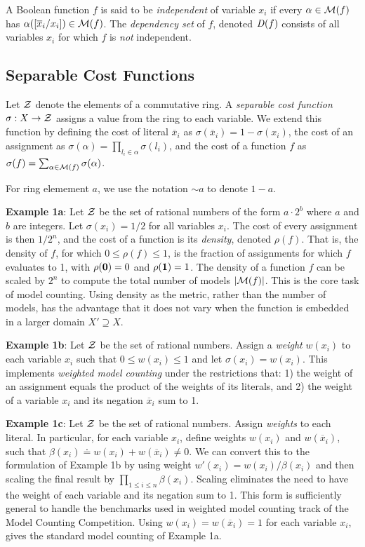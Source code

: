 \documentclass{llncs}
\newcommand{\one}{\mbox{\bf 1}}
\newcommand{\zero}{\mbox{\bf 0}}
\newcommand{\obar}[1]{\overline{#1}}
\newcommand{\oneminus}{{\sim}}
\newcommand{\interp}{\alpha}
\newcommand{\interpset}[1]{{\cal M}(#1)}
\newcommand{\ring}{{\cal Z}}
\newcommand{\cost}{\sigma}
\newcommand{\density}{\rho}
\newcommand{\depend}{{\it D}}
\newcommand{\subs}[2]{[#2/#1]}
\begin{document}
A Boolean function $f$ is said to be {\em independent} of variable
$x_i$ if every $\interp \in \interpset{f}$ has
$\interp(\subs{x_i}{\obar{x}_i}) \in \interpset{f}$.
The {\em dependency set} of $f$, denoted
$\depend(f)$ consists of all variables $x_i$ for which $f$ is {\em
  not} independent.

\subsection{Separable Cost Functions}

Let $\ring$ denote the elements of a commutative ring.  A {\em
  separable cost function} $\cost:X \rightarrow \ring$ assigns a value
from the ring to each variable.  We extend this function by defining
the cost of literal $\obar{x}_i$ as $\cost(\obar{x}_i) = 1 - \cost(x_i)$, the cost
of an assignment as
$\cost(\interp) = \prod_{l_i \in \interp} \cost(l_i)$,
and the cost of a function $f$ as
$\cost(f) = \sum_{\interp \in \interpset{f}} \cost(\interp)$.

For ring elemement $a$, we use the notation $\oneminus a$ to denote $1 - a$.

{\bf Example 1a}: Let $\ring$ be the set of rational numbers of the form $a\cdot 2^b$ where $a$ and $b$ are integers.
Let $\cost(x_i) = 1/2$ for all variables $x_i$.  The cost of every
assignment is then $1/2^{n}$, and the cost of a function is its
{\em density}, denoted $\density(f)$.  That is, the density of $f$, for which
$0 \leq \density(f) \leq 1$, 
is the fraction of assignments for which $f$
evaluates to 1, with $\density(\zero) = 0$ and $\density(\one) = 1$.  The density of a function
$f$ can be scaled by $2^n$ to compute the total number of models
$|\interpset{f}|$.  This is the core task of model counting.  Using
density as the metric, rather than the number of models, has the advantage that it does not vary when the
function is embedded in a larger domain $X' \supseteq X$.  

{\bf Example 1b}: Let $\ring$ be the set of rational numbers.  Assign a
{\em weight} $w(x_i)$ to each variable $x_i$ such that
$0 \leq w(x_i) \leq 1$
and let $\cost(x_i) = w(x_i)$.  This implements {\em weighted model counting}
under the restrictions that: 
1) the
weight of an assignment equals the product of the weights of its
literals, and 2) the weight of a variable $x_i$ and its negation
$\obar{x}_i$ sum to 1.

{\bf Example 1c}: Let $\ring$ be the set of rational numbers.  Assign
{\em weights} to each literal.  In particular, for each variable
$x_i$, define weights $w(x_i)$ and $w(\obar{x}_i)$, such that
$\beta(x_i) \doteq w(x_i) + w(\obar{x}_i) \not = 0$.  We can convert
this to the formulation of Example 1b by using weight $w'(x_i) =
w(x_i)/\beta(x_i)$ and then scaling the final result by $\prod_{1 \leq
  i \leq n} \beta(x_i)$.  Scaling eliminates the need to have the weight
of each variable and its negation sum to 1.  This form is sufficiently general
to handle the benchmarks used in weighted model counting track of the Model Counting Competition.
Using $w(x_i) = w(\obar{x}_i) = 1$ for each variable $x_i$,
gives the standard model counting of Example 1a.
\end{document}

